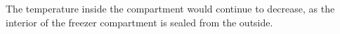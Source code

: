 The temperature inside the compartment would continue to decrease, as the interior of the freezer compartment is sealed from the outside.